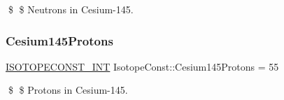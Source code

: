 \$ \$ Neutrons in Cesium-\/145. \mbox{\label{group___isotope_const-_cesium-_cs145_ga8252e6960e2fda17f19b3730e5b79636}} 
\subsubsection{\texorpdfstring{Cesium145\+Protons}{Cesium145Protons}}
{\footnotesize\ttfamily \mbox{\hyperlink{group___isotope_const-_macros_ga5f18360b3e99483a35c32d789e62621c}{I\+S\+O\+T\+O\+P\+E\+C\+O\+N\+S\+T\+\_\+\+I\+NT}} Isotope\+Const\+::\+Cesium145\+Protons = 55}

\$ \$ Protons in Cesium-\/145. 